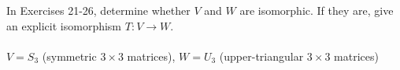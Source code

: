\documentclass[12pt,letterpaper]{hmcpset}
\begin{document}
\begin{problem}[6.5.22]
    In Exercises 21-26, determine whether $V$ and $W$ are
    isomorphic. If they are, give an explicit isomorphism $T:V\to W$.\\\\
    $V=S_3$ (symmetric $3\times3$ matrices), $W=U_3$ (upper-triangular
    $3\times3$ matrices)
\end{problem}
\begin{solution}
    \vfill
\end{solution}
\end{document}
